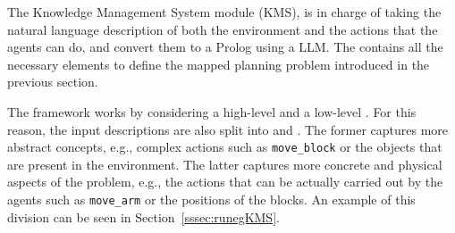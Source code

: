The Knowledge Management System module (KMS), is in charge of taking the natural language description of both the environment and the actions that the agents can do, and convert them to a Prolog \kb using a LLM. 
The \kb contains all the necessary elements to define the mapped planning problem introduced in the previous section.

The framework works by considering a high-level and a low-level \kbase. For this reason, the input descriptions are also split into \HL and \LL. The former captures more abstract concepts, e.g., complex actions such as \verb|move_block| or the objects that are present in the environment. The latter captures more concrete and physical aspects of the problem, e.g., the actions that can be actually carried out by the agents such as \verb|move_arm| or the positions of the blocks. An example of this division can be seen in Section~\ref{sssec:runegKMS}.

